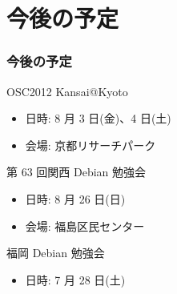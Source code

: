 \documentclass[cjk,dvipdfmx,10pt,%
hyperref={bookmarks=true,bookmarksnumbered=true,bookmarksopen=false,%
colorlinks=false,%
pdftitle={第 61 回 関西 Debian 勉強会},%
pdfauthor={倉敷・のがた・かわだ・佐々木},%
pdfsubject={資料},%
}]{beamer}
\begin{document}
\section{今後の予定}
\begin{frame}[fragile]
\frametitle{今後の予定}

\begin{block}{OSC2012 Kansai@Kyoto}
\begin{itemize}
  \item 日時: 8 月 3 日(金)、4 日(土)
  \item 会場: 京都リサーチパーク
\end{itemize}
\end{block}

\begin{block}{第 63 回関西 Debian 勉強会}
\begin{itemize}
  \item 日時: 8 月 26 日(日)
  \item 会場: 福島区民センター
\end{itemize}
\end{block}

\begin{block}{福岡 Debian 勉強会}
  \begin{itemize}
  \item 日時: 7 月 28 日(土)
  \end{itemize}
\end{block}

\end{frame}


\takahashi[50]{  }
\end{document}
